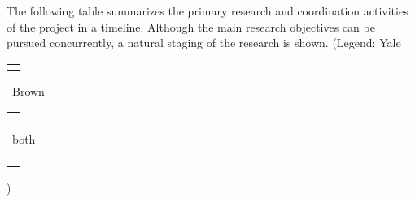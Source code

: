 \def\graycell{\cellcolor[RGB]{200,200,200}}
\def\acell{\cellcolor[rgb]{.98,.81,.69}}
\def\bcell{\cellcolor[rgb]{0.54, 0.81, 0.94}}
\def\ccell{\cellcolor[rgb]{0.98, 0.91, 0.71}}
\def\dcell{\cellcolor[rgb]{0.64, 0.76, 0.68}}
\def\ecell{\cellcolor[rgb]{0.96, 0.76, 0.76}}
\def\g{}
\def\g{\graycell}
\def\a{\acell}
\def\b{\bcell}
\def\c{\ccell}
\def\d{\dcell}
\def\e{\ecell}
\def\yale{\bcell}
\def\brown{\ecell}
\def\both{\acell}


\def\topic#1{\multicolumn{13}{c}{}\\
  \multicolumn{1}{l}{\bf #1 } & \multicolumn{12}{c}{} \\[3pt] \hline}
\def\numb#1{\hbox to 13pt{\hfill \footnotesize #1\hfill}}
\def\ffour{\numb{Q4}}
\def\three{\numb{Q3}}
\def\two{\numb{Q2}}
\def\one{\numb{Q1}}
\def\four{\multicolumn{1}{c|}{\ffour}}


\vskip10pt
\noindent 
The following table summarizes the primary research and coordination
activities of the project in a timeline. 
Although the main research objectives 
can be pursued concurrently, a natural staging of the research is shown.
\def\minicell#1{{\small \begin{tabular}{c}#1\end{tabular}}}
(Legend: Yale \minicell{\yale}\, Brown \minicell{\brown}\, both \minicell{\both})


